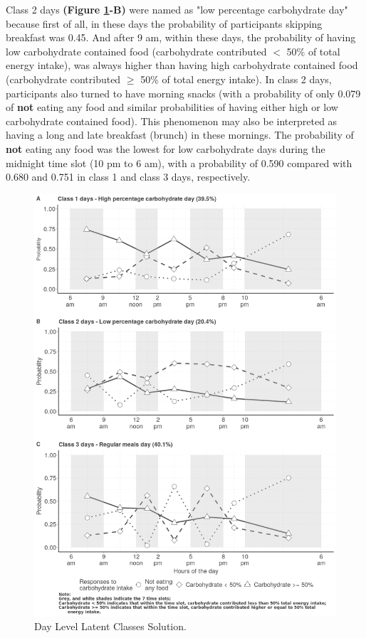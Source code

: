 Class 2 days \textbf{(Figure \ref{fig:level1}-B)} were named as "low percentage carbohydrate day" because first of all, in these days the probability of participants skipping breakfast was 0.45. And after 9 am, within these days, the probability of having low carbohydrate contained food (carbohydrate contributed $<$ 50\% of total energy intake), was always higher than having high carbohydrate contained food (carbohydrate contributed $\geqslant$ 50\% of total energy intake). In class 2 days, participants also turned to have morning snacks (with a probability of only 0.079 of \textbf{not} eating any food and similar probabilities of having either high or low carbohydrate contained food). This phenomenon may also be interpreted as having a long and late breakfast (brunch) in these mornings. The probability of \textbf{not} eating any food was the lowest for low carbohydrate days during the midnight time slot (10 pm to 6 am), with a probability of 0.590 compared with 0.680 and 0.751 in class 1 and class 3 days, respectively. 





\begin{figure}[H]
	\centering
	\includegraphics[width=13cm]{Figures/level1.png}
	\decoRule
	\caption[Day Level Latent Class Solution.]{Day Level Latent Classes Solution.}
	\label{fig:level1}
\end{figure}
\vspace{-0.6cm}

